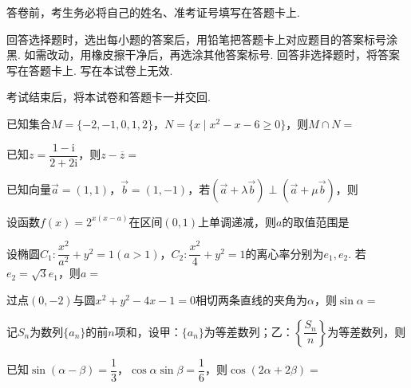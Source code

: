 \documentclass[a4paper,11pt]{report}
\begin{document}
\examfontsize



\noticetitle
\begin{examnotice}
\item 答卷前，考生务必将自己的姓名、准考证号填写在答题卡上. 
\item 回答选择题时，选出每小题的答案后，用铅笔把答题卡上对应题目的答案标号涂黑. 如需改动，用橡皮擦干净后，再选涂其他答案标号. 回答非选择题时，将答案写在答题卡上. 写在本试卷上无效. 
\item 考试结束后，将本试卷和答题卡一并交回. 
\end{examnotice}

\begin{examquestions}
\item 已知集合$M=\{-2,-1,0,1,2\}$，$N=\{x\mid x^2-x-6\geq0\}$，则$M\cap N=$
\item 已知$z=\dfrac{1-\mathrm{i}}{2+2\mathrm{i}}$，则$z-\overline z=$
\item 已知向量$\vec a=(1,1)$，$\vec b=(1,-1)$，若$(\vec a+\lambda\vec b)\perp(\vec a+\mu\vec b)$，则
\item 设函数$f(x)=2^{x(x-a)}$在区间$(0,1)$上单调递减，则$a$的取值范围是
\twochoices{$(-\infty,-2]$}{$[-2,0)$}{$(0,2]$}{$[2,+\infty)$}
\item 设椭圆$C_1:\dfrac{x^2}{a^2}+y^2=1(a>1)$，$C_2:\dfrac{x^2}{4}+y^2=1$的离心率分别为$e_1,e_2$. 若$e_2=\sqrt3e_1$，则$a=$
\item 过点$(0,-2)$与圆$x^2+y^2-4x-1=0$相切两条直线的夹角为$\alpha$，则$\sin\alpha=$
\item 记$S_n$为数列$\{a_n\}$的前$n$项和，设甲：$\{a_n\}$为等差数列；乙：$\left\{\dfrac{S_n}{n}\right\}$为等差数列，则
\item 已知$\sin(\alpha-\beta)=\dfrac13$，$\cos\alpha\sin\beta=\dfrac16$，则$\cos(2\alpha+2\beta)=$
\end{examquestions}
\end{document}
